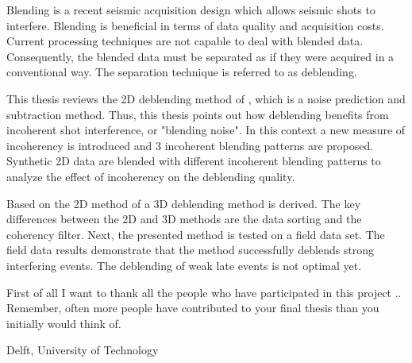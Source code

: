 \documentclass[a4paper,11pt]{mscThesis}
\begin{document}
%
\frontmatter %
%
    \maketitle
%
Blending is a recent seismic acquisition design which allows seismic shots to interfere. Blending is beneficial in terms of data quality and acquisition costs. Current processing techniques are not capable to deal with blended data. Consequently, the blended data must be separated as if they were acquired in a conventional way. The separation technique is referred to as deblending.

This thesis reviews the 2D deblending method of \citet{Mahdad-Deblending-Method}, which is a noise prediction and subtraction method. Thus, this thesis points out how deblending benefits from incoherent shot interference, or "blending noise". In this context a new measure of incoherency is introduced and 3 incoherent blending patterns are proposed. Synthetic 2D data are blended with different incoherent blending patterns to analyze the effect of incoherency on the deblending quality.

Based on the 2D method of \citet{Mahdad-Deblending-Method} a 3D deblending method is derived. The key differences between the 2D and 3D methods are the data sorting and the coherency filter. Next, the presented method is tested on a field data set. The field data results demonstrate that the method successfully deblends strong interfering events. The deblending of weak late events is not optimal yet.

 

   
    \cleardoublepage
%
    First of all I want to thank all the people who have participated in this project ..
    Remember, often more people have contributed to your final thesis than you initially would think of.
    \vspace*{15mm}

    \noindent
    Delft, University of Technology \hfill \mscname\\ %
    \mscdate

%
    \tocloflot
%
%
    \begin{acronym}%
    \end{acronym}%
    \cleardoublepage%
    
\end{document}
